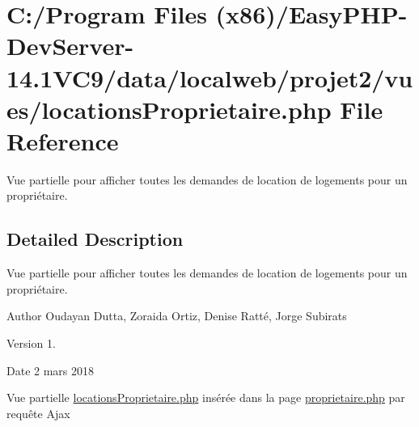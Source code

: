\hypertarget{locations_proprietaire_8php}{}\section{C\+:/\+Program Files (x86)/\+Easy\+P\+H\+P-\/\+Dev\+Server-\/14.1\+V\+C9/data/localweb/projet2/vues/locations\+Proprietaire.php File Reference}
\label{locations_proprietaire_8php}


Vue partielle pour afficher toutes les demandes de location de logements pour un propriétaire.  




\subsection{Detailed Description}
Vue partielle pour afficher toutes les demandes de location de logements pour un propriétaire. 

\begin{DoxyAuthor}{Author}
Oudayan Dutta, Zoraida Ortiz, Denise Ratté, Jorge Subirats 
\end{DoxyAuthor}
\begin{DoxyVersion}{Version}
1. 
\end{DoxyVersion}
\begin{DoxyDate}{Date}
2 mars 2018
\end{DoxyDate}
Vue partielle \hyperlink{locations_proprietaire_8php}{locations\+Proprietaire.\+php} insérée dans la page \hyperlink{proprietaire_8php}{proprietaire.\+php} par requête Ajax 
